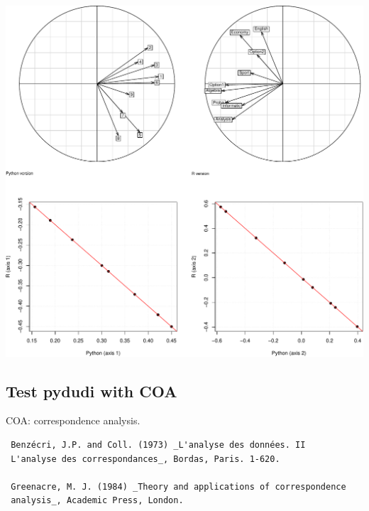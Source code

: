 \documentclass[
  10pt,
]{article}
\newenvironment{Shaded}{\begin{snugshade}}{\end{snugshade}}
\newcommand{\NormalTok}[1]{#1}
\begin{document}
\begin{Shaded}
\end{Shaded}

\includegraphics{RandPytonAnalysisPDF_files/figure-latex/unnamed-chunk-18-1.pdf}

\hypertarget{test-pydudi-with-coa}{%
\subsection{Test pydudi with COA}\label{test-pydudi-with-coa}}

COA: correspondence analysis.

\begin{verbatim}
 Benzécri, J.P. and Coll. (1973) _L'analyse des données. II
 L'analyse des correspondances_, Bordas, Paris. 1-620.
 
 Greenacre, M. J. (1984) _Theory and applications of correspondence
 analysis_, Academic Press, London.
\end{verbatim}
\end{document}
